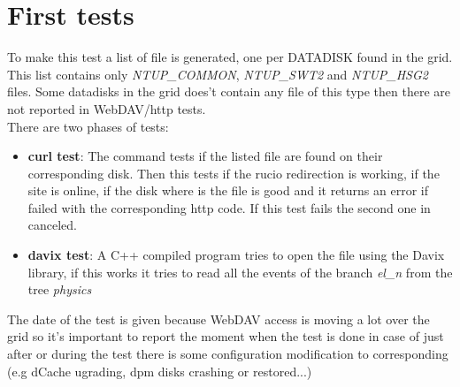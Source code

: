 \section{First tests}

To make this test a list of file is generated, one per DATADISK found in the grid. This list contains only \textit{NTUP\_COMMON}, \textit{NTUP\_SWT2} and \textit{NTUP\_HSG2} files. Some datadisks in the grid does't contain any file of this type then there are not reported in WebDAV/http tests.\\

There are two phases of tests:

\begin{itemize}
	\item \textbf{curl test}: The command tests if the listed file are found on their corresponding disk. Then this tests if the rucio redirection is working, if the site is online, if the disk where is the file is good and it returns an error if failed with the corresponding http code. If this test fails the second one in canceled.
	\item \textbf{davix test}: A C++ compiled program tries to open the file using the Davix library, if this works it tries to read all the events of the branch \textit{el\_n} from the tree \textit{physics}
\end{itemize}

The date of the test is given because WebDAV access is moving a lot over the grid so it's important to report the moment when the test is done in case of just after or during the test there is some configuration modification to corresponding (e.g dCache ugrading, dpm disks crashing or restored...)\\



